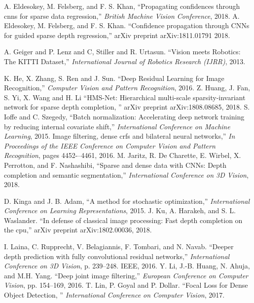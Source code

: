 \documentclass{main_style}
\begin{document}
\begin{thebibliography}{99}
A. Eldesokey, M. Felsberg, and F. S. Khan, ``Propagating confidences
through cnns for sparse data regression,'' \textit{British Machine
Vision Conference}, 2018.
A. Eldesokey, M. Felsberg, and F. S. Khan. ``Confidence propagation through CNNs for
guided sparse depth regression,'' arXiv preprint arXiv:1811.01791 2018.

    A. Geiger and P. Lenz and C, Stiller and R. Urtasun.
 ``Vision meets Robotics: The KITTI Dataset,''
  \textit{International Journal of Robotics Research (IJRR)}, 2013.
  
K. He, X. Zhang, S. Ren and J. Sun.
``Deep Residual Learning for Image Recognition,'' \textit{Computer Vision and Pattern Recognition}, 2016.
Z. Huang, J. Fan, S. Yi, X. Wang and H. Li
``HMS-Net: Hierarchical multi-scale sparsity-invariant network for sparse depth completion, ''
arXiv preprint arXiv:1808.08685, 2018.
S. Ioffe and C. Szegedy, ``Batch normalization: Accelerating deep
network training by reducing internal covariate shift,” \textit{International
Conference on Machine Learning}, 2015.
Image filtering, dense crfs and bilateral neural networks,'' \textit{In Proceedings of the IEEE
Conference on Computer Vision and Pattern Recognition}, pages 4452-–4461, 2016.
M. Jaritz, R. De Charette, E. Wirbel, X. Perrotton, and F. Nashashibi,
``Sparse and dense data with CNNs: Depth completion and semantic
segmentation,'' \textit{International Conference on 3D Vision}, 2018.

D. Kinga and J. B. Adam, ``A method for stochastic optimization,''
\textit{International Conference on Learning Representations}, 2015.
J. Ku, A. Harakeh, and S. L. Waslander. ``In defense of classical
image processing: Fast depth completion on the cpu,''
arXiv preprint arXiv:1802.00036, 2018.

I. Laina, C. Rupprecht, V. Belagiannis, F. Tombari, and
N. Navab. ``Deeper depth prediction with fully convolutional
residual networks,'' \textit{International Conference on 3D Vision}, p. 239--248. IEEE, 2016.
Y. Li, J.-B. Huang, N. Ahuja, and M.H. Yang.
``Deep joint image
filtering,'' \textit{European Conference on Computer Vision}, pp. 154–169,
2016.
T. Lin, P. Goyal and P. Dollar.
``Focal Loss for Dense Object Detection, '' \textit{International Conference on Computer Vision}, 2017.



\end{thebibliography}
\end{document}
